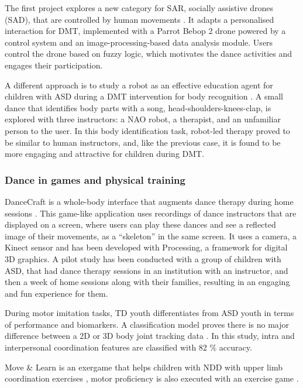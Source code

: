 \documentclass[a4paper,fleqn]{cas-sc}
\begin{document}
The first project explores a new category for SAR, socially assistive drones (SAD), that are controlled by human movements \cite{Ascensao22}. It adapts a personalised interaction for DMT, implemented with a Parrot Bebop 2 drone powered by a control system and an image-processing-based data analysis module. Users control the drone based on fuzzy logic, which motivates the dance activities and engages their participation.

A different approach is to study a robot as an effective education agent for children with ASD during a DMT intervention for body recognition \cite{Suzuki17}. A small dance that identifies body parts with a song, head-shoulders-knees-clap, is explored with three instructors: a NAO robot, a therapist, and an unfamiliar person to the user. In this body identification task, robot-led therapy proved to be similar to human instructors, and, like the previous case, it is found to be more engaging and attractive for children during DMT.



\subsubsection{Dance in games and physical training}  %

DanceCraft is a whole-body interface that augments dance therapy during home sessions \cite{Ringland19}. This game-like application uses recordings of dance instructors that are displayed on a screen, where users can play these dances and see a reflected image of their movements, as a ``skeleton'' in the same screen. It uses a camera, a Kinect sensor and has been developed with Processing, a framework for digital 3D graphics. A pilot study has been conducted with a group of children with ASD, that had dance therapy sessions in an institution with an instructor, and then a week of home sessions along with their families, resulting in an engaging and fun experience for them.

During motor imitation tasks, TD youth differentiates from ASD youth in terms of performance and biomarkers. A classification model proves there is no major difference between a 2D or 3D body joint tracking data \cite{Zampella21}. In this study, intra and interpersonal coordination features are classified with 82 \% accuracy.

Move \& Learn is an exergame that helps children with NDD with upper limb coordination exercises \cite{Raygoza-Romero21}, motor proficiency is also executed with an exercise game  \cite{Hocking22}.
\end{document}
